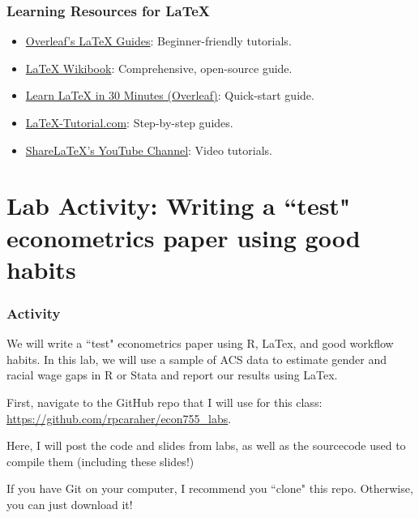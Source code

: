 \documentclass{beamer}
\begin{document}
    \begin{frame}
        \frametitle{Learning Resources for \LaTeX{}}

    \begin{itemize}
        \item \href{https://www.overleaf.com/learn/latex}{Overleaf's \LaTeX{} Guides}: Beginner-friendly tutorials.
        \item \href{https://en.wikibooks.org/wiki/LaTeX}{\LaTeX{} Wikibook}: Comprehensive, open-source guide.
        \item \href{https://www.overleaf.com/learn/latex/Learn_LaTeX_in_30_minutes}{Learn \LaTeX{} in 30 Minutes (Overleaf)}: Quick-start guide.
        \item \href{https://www.latex-tutorial.com/}{LaTeX-Tutorial.com}: Step-by-step guides.
        \item \href{https://www.youtube.com/user/ShareLaTeX/videos}{ShareLaTeX's YouTube Channel}: Video tutorials.
    \end{itemize}
    \end{frame}


\section{Lab Activity: Writing a ``test" econometrics paper using good habits}
\label{sec:activity}

\begin{frame}
    \frametitle{Activity}

We will write a ``test" econometrics paper using R, LaTex, and good workflow habits.
In this lab, we will use a sample of ACS data to estimate gender and racial wage gaps in R or Stata and report our results using LaTex.

\vspace{10pt}

First, navigate to the GitHub repo that I will use for this class: \url{https://github.com/rpcaraher/econ755_labs}.

\vspace{10pt}

Here, I will post the code and slides from labs, as well as the sourcecode used to compile them (including these slides!)

\vspace{10pt}

If you have Git on your computer, I recommend you ``clone" this repo. Otherwise, you can just download it!

\end{frame}

\end{document}
